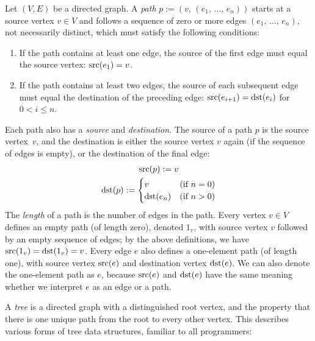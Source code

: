 \documentclass[../generics]{subfiles}
\begin{document}
\begin{definition}\label{digraph path}
Let $(V,E)$ be a directed graph. A \emph{path} $p := (v,\,(e_1,\,\ldots,\,e_n))$ starts at a source vertex $v\in V$ and follows a sequence of zero or more edges $(e_1,\,\ldots,\,e_n)$, not necessarily distinct, which must satisfy the following conditions:
\begin{enumerate}
\item If the path contains at least one edge, the source of the first edge must equal the source vertex: $\operatorname{src}(e_1)=v$.
\item If the path contains at least two edges, the source of each subsequent edge must equal the destination of the preceding edge: $\operatorname{src}(e_{i+1})=\operatorname{dst}(e_i)$ for $0<i\leq n$.
\end{enumerate}
Each path also has a \emph{source} and \emph{destination}. The source of a path $p$ is the source vertex~$v$, and the destination is either the source vertex $v$ again (if the sequence of edges is empty), or the destination of the final edge:
\begin{gather*}
\operatorname{src}(p) := v\\
\operatorname{dst}(p) := \begin{cases}
v&\text{(if $n=0$)}\\
\operatorname{dst}(e_n)&\text{(if $n>0$)}
\end{cases}
\end{gather*}
The \emph{length} of a path is the number of edges in the path. Every vertex $v\in V$ defines an empty path (of length zero), denoted $1_v$, with source vertex $v$ followed by an empty sequence of edges; by the above definitions, we have $\operatorname{src}(1_v)=\operatorname{dst}(1_v)=v$. Every edge $e$ also defines a one-element path (of length one), with source vertex $\operatorname{src}(e)$ and destination vertex $\operatorname{dst}(e)$. We can also denote the one-element path as $e$, because $\operatorname{src}(e)$ and $\operatorname{dst}(e)$ have the same meaning whether we interpret $e$ as an edge or a path.
\end{definition}

\begin{definition} A \emph{tree} is a directed graph with a distinguished root vertex, and the property that there is one unique path from the root to every other vertex. This describes various forms of tree data structures, familiar to all programmers:
\begin{center}
\end{center}
\end{definition}
\end{document}
